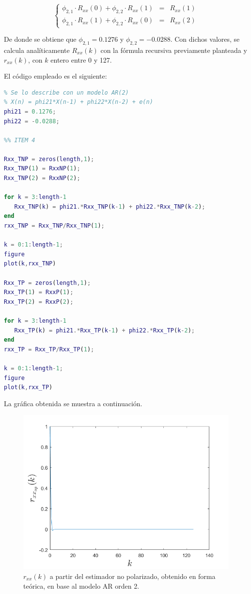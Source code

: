 \[
\left\{
\begin{array}{lll}
     \phi_{2,1} \cdot R_{xx}(0) + \phi_{2,2} \cdot R_{xx}(1) & = & R_{xx}(1) 
  \\ \phi_{2,1} \cdot R_{xx}(1) + \phi_{2,2} \cdot R_{xx}(0) & = & R_{xx}(2)
\end{array}
\right.
\]

De donde se obtiene que $\phi_{2,1} = 0.1276$ y $\phi_{2,2} = -0.0288$. Con dichos valores, se calcula anal\'iticamente $R_{xx}(k)$ con la fórmula recursiva previamente planteada y $ r_{xx}(k) $, con $k$ entero entre 0 y 127. 

El código empleado es el siguiente:

\begin{lstlisting}[language=Matlab, caption=EJ1.m]
%% ITEM 3
% Se lo describe con un modelo AR(2)
% X(n) = phi21*X(n-1) + phi22*X(n-2) + e(n)
phi21 = 0.1276;
phi22 = -0.0288;

%% ITEM 4

Rxx_TNP = zeros(length,1);
Rxx_TNP(1) = RxxNP(1);
Rxx_TNP(2) = RxxNP(2);

for k = 3:length-1
   Rxx_TNP(k) = phi21.*Rxx_TNP(k-1) + phi22.*Rxx_TNP(k-2); 
end
rxx_TNP = Rxx_TNP/Rxx_TNP(1);

k = 0:1:length-1;
figure
plot(k,rxx_TNP)

Rxx_TP = zeros(length,1);
Rxx_TP(1) = RxxP(1);
Rxx_TP(2) = RxxP(2);

for k = 3:length-1
   Rxx_TP(k) = phi21.*Rxx_TP(k-1) + phi22.*Rxx_TP(k-2); 
end
rxx_TP = Rxx_TP/Rxx_TP(1);

k = 0:1:length-1;
figure
plot(k,rxx_TP)
\end{lstlisting}

La gráfica obtenida se muestra a continuación.

\begin{figure}[H] %
\centering
\includegraphics[scale=0.45]{../EJ1/rxxNPteorico}
\caption{$r_{xx}(k)$ a partir del estimador no polarizado, obtenido en forma teórica, en base al modelo AR orden 2.}
\label{rxxTeo}
\end{figure}

